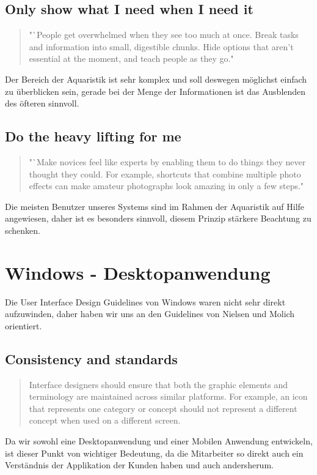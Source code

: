 \subsection{Only show what I need when I need it}
\begin{quote} "`People get overwhelmed when they see too much at once. Break tasks and information into small, digestible chunks. Hide options that aren't essential at the moment, and teach people as they go."\end{quote}

Der Bereich der Aquaristik ist sehr komplex und soll deswegen möglichst einfach zu überblicken sein, gerade bei der Menge der Informationen ist das Ausblenden des öfteren sinnvoll.
 
\subsection{Do the heavy lifting for me}
\begin{quote} "`Make novices feel like experts by enabling them to do things they never thought they could. For example, shortcuts that combine multiple photo effects can make amateur photographs look amazing in only a few steps."\end{quote}

Die meisten Benutzer unseres Systems sind im Rahmen der Aquaristik auf Hilfe angewiesen, daher ist es besonders sinnvoll, diesem Prinzip stärkere Beachtung zu schenken.


\section{Windows - Desktopanwendung}
Die User Interface Design Guidelines von Windows waren nicht sehr direkt aufzuwinden, daher haben wir uns an den Guidelines von Nielsen und Molich orientiert.

\subsection{Consistency and standards}
\begin{quote} Interface designers should ensure that both the graphic elements and terminology are maintained across similar platforms. For example, an icon that represents one category or concept should not represent a different concept when used on a different screen.\end{quote}
 
Da wir sowohl eine Desktopanwendung und einer Mobilen Anwendung entwickeln, ist dieser Punkt von wichtiger Bedeutung, da die Mitarbeiter so direkt auch ein Verständnis der Applikation der Kunden haben und auch andersherum.
 
